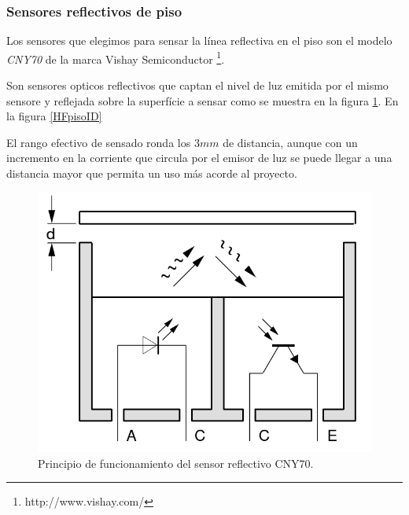 \subsubsection{Sensores reflectivos de piso}
\label{Hpiso}

Los sensores que elegimos para sensar la l\'inea reflectiva en el piso son el modelo \emph{CNY70} de la marca Vishay Semiconductor
\footnote{http://www.vishay.com/}.

Son sensores opticos reflectivos que captan el nivel de luz emitida por el mismo sensore y reflejada sobre la superf\'icie a sensar
como se muestra en la figura \ref{HFpiso}. En la figura \ref{HFpisoID} 

El rango efectivo de sensado ronda los $3 mm$ de distancia, aunque con un incremento en la corriente que circula por el emisor de luz
se puede llegar a una distancia mayor que permita un uso m\'as acorde al proyecto.

\begin{figure}[ht]
	\centering
	\includegraphics[scale=0.15]{piso.png}
	\caption{Principio de funcionamiento del sensor reflectivo CNY70.}
	\label{HFpiso}
\end{figure}


